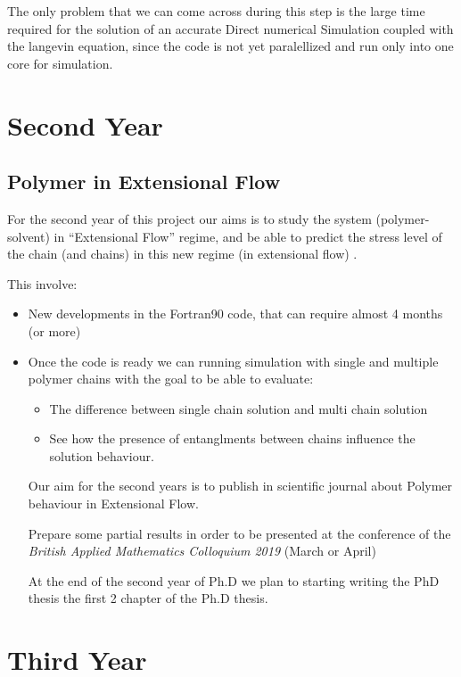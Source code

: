 The only problem that we can come across during this step is the large time required for the solution of an accurate Direct numerical Simulation coupled with the langevin equation, since the code is not yet 
paralellized and run only into one core for simulation.




\section{Second Year}

\subsection{Polymer in Extensional Flow}

For the second year of this project our aims is to study the system (polymer-solvent) in ``Extensional Flow'' regime, and be able to predict the stress level of the chain (and chains) in this new regime (in extensional flow) . 

This involve:
\begin{itemize}

\item New developments in the Fortran90 code, that can require almost 4 months (or more)

\item Once the code is ready we can running simulation with single and multiple polymer chains with the goal to be able to evaluate:
\begin{itemize}
  \item The difference between single chain solution and multi chain solution

  \item See how the presence of entanglments between chains influence the solution behaviour.
\end{itemize}

Our aim for the second years is to publish in scientific journal about Polymer behaviour in Extensional Flow. 

Prepare some partial results in order to be presented at the conference of the \emph{British Applied Mathematics Colloquium 2019} (March or April) 

At the end of the second year of Ph.D we plan to starting writing the PhD thesis the first 2 chapter of the Ph.D thesis. 


\end{itemize}
\section{Third Year}

